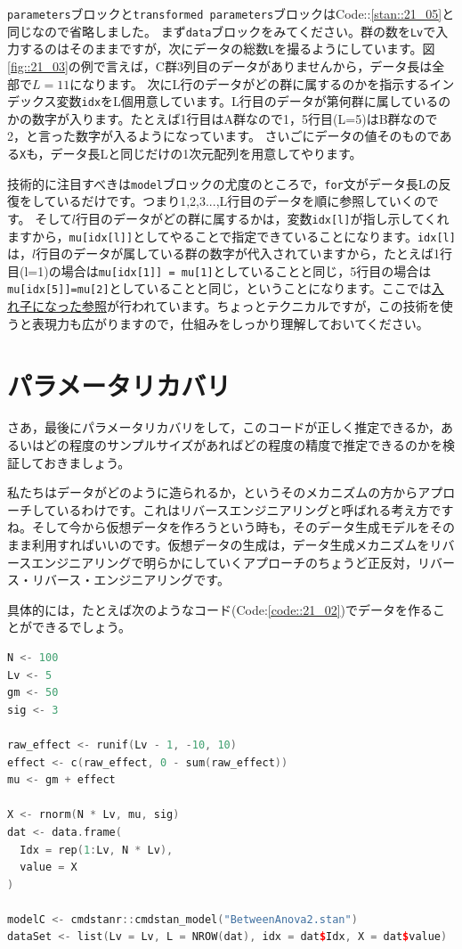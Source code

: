 \documentclass{ltjsbook}
\begin{document}
\verb|parameters|ブロックと\verb|transformed parameters|ブロックはCode::\ref{stan::21_05}と同じなので省略しました。
まず\verb|data|ブロックをみてください。群の数を\verb|Lv|で入力するのはそのままですが，次にデータの総数\verb|L|を撮るようにしています。図\ref{fig::21_03}の例で言えば，C群3列目のデータがありませんから，データ長は全部で$L=11$になります。
次にL行のデータがどの群に属するのかを指示するインデックス変数\verb|idx|をL個用意しています。L行目のデータが第何群に属しているのかの数字が入ります。たとえば1行目はA群なので1，5行目(L=5)はB群なので2，と言った数字が入るようになっています。
さいごにデータの値そのものである\verb|X|も，データ長Lと同じだけの1次元配列を用意してやります。

技術的に注目すべきは\verb|model|ブロックの尤度のところで，\verb|for|文がデータ長Lの反復をしているだけです。つまり1,2,3...,L行目のデータを順に参照していくのです。
そして$l$行目のデータがどの群に属するかは，変数\verb|idx[l]|が指し示してくれますから，\verb|mu[idx[l]]|としてやることで指定できていることになります。\verb|idx[l]|は，$l$行目のデータが属している群の数字が代入されていますから，たとえば1行目(l=1)の場合は\verb|mu[idx[1]] = mu[1]|としていることと同じ，5行目の場合は\verb|mu[idx[5]]=mu[2]|としていることと同じ，ということになります。ここでは\underline{入れ子になった参照}が行われています。ちょっとテクニカルですが，この技術を使うと表現力も広がりますので，仕組みをしっかり理解しておいてください。

\section{パラメータリカバリ}
さあ，最後にパラメータリカバリをして，このコードが正しく推定できるか，あるいはどの程度のサンプルサイズがあればどの程度の精度で推定できるのかを検証しておきましょう。

私たちはデータがどのように造られるか，というそのメカニズムの方からアプローチしているわけです。これはリバースエンジニアリングと呼ばれる考え方ですね。そして今から仮想データを作ろうという時も，そのデータ生成モデルをそのまま利用すればいいのです。仮想データの生成は，データ生成メカニズムをリバースエンジニアリングで明らかにしていくアプローチのちょうど正反対，リバース・リバース・エンジニアリングです。

具体的には，たとえば次のようなコード(Code:\ref{code::21_02})でデータを作ることができるでしょう。
\begin{lstlisting}[language=c++,label={code::21_02},caption={リバースエンジニアリング}]
N <- 100
Lv <- 5
gm <- 50
sig <- 3

raw_effect <- runif(Lv - 1, -10, 10)
effect <- c(raw_effect, 0 - sum(raw_effect))
mu <- gm + effect

X <- rnorm(N * Lv, mu, sig)
dat <- data.frame(
  Idx = rep(1:Lv, N * Lv),
  value = X
)

modelC <- cmdstanr::cmdstan_model("BetweenAnova2.stan")
dataSet <- list(Lv = Lv, L = NROW(dat), idx = dat$Idx, X = dat$value)
\end{lstlisting}
\end{document}
